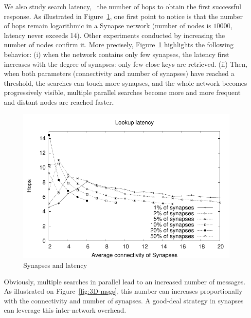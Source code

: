 We also study search latency, \ie\ the number of hops to obtain the
first successful response.
As illustrated in Figure~\ref{fig:3D-hops}, one first point to notice
is that the number of hops remain logarithmic in a Synapse network
(number of nodes is $10000$, latency never exceeds 14). Other
experiments conducted by increasing the number of nodes confirm
it. More precisely, Figure~\ref{fig:3D-hops} highlights the following
behavior: (i) when the network contains only few synapses, the latency
first increases with the degree of synapses: only few close keys are
retrieved.  (ii) Then, when both parameters (connectivity and number
of synapses) have reached a threshold, the searches can touch more
synapses, and the whole network becomes progressively visible,
multiple parallel searches become more and more frequent and distant
nodes are reached faster.
%
\begin{figure}
        \includegraphics[width=\linewidth]{fig/3D-hops.pdf}
        \caption{Synapses and latency\label{fig:3D-hops}}
\end{figure}
%
Obviously, multiple searches in parallel lead to an increased number
of messages. As illustrated on Figure~\ref{fig:3D-msgs}, this number
can increases proportionally with the connectivity and number of
synapses. A good-deal strategy in synapses can leverage this
inter-network overhead.

